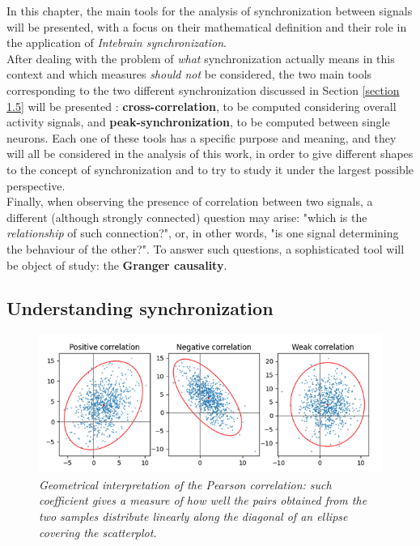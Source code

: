\documentclass[12pt, a4paper]{article}
\begin{document}
In this chapter, the main tools for the analysis of synchronization between signals will be presented, with a focus on their mathematical definition and their role in the application of \textit{Intebrain synchronization}.\\
After dealing with the problem of \textit{what} synchronization actually means in this context and which measures \textit{should not} be considered, the two main tools corresponding to the two different synchronization discussed in Section \ref{section 1.5} will be presented :\textbf{ cross-correlation}, to be computed considering overall activity signals, and \textbf{peak-synchronization}, to be computed between single neurons. Each one of these tools has a specific purpose and meaning, and they will all be considered in the analysis of this work, in order to give different shapes to the concept of synchronization and to try to study it under the largest possible perspective.\\
Finally, when observing the presence of correlation between two signals, a different (although strongly connected) question may arise: "which is the \textit{relationship} of such connection?", or, in other words, "is one signal determining the behaviour of the other?". To answer such questions, a sophisticated tool will be object of study: the \textbf{Granger causality}.


\subsection{Understanding synchronization}

\begin{figure}[H]
	\begin{center}
		\includegraphics[scale=.75]{pearson.png} 
	\end{center} 
	\caption{\textit{Geometrical interpretation of the Pearson correlation: such coefficient gives a measure of how well the pairs obtained from the two samples distribute linearly along the diagonal of an ellipse covering the scatterplot. }}
	
\end{figure}
\end{document}
